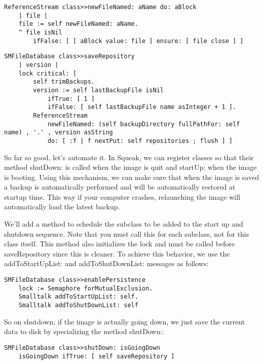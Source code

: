 \documentclass[a4paper,10pt,twoside]{book}
\newcommand{\ct}[1]{{\small\ttfamily\textup{#1}}}
\begin{document}
\begin{lstlisting}
ReferenceStream class>>newFileNamed: aName do: aBlock
    | file |
    file := self newFileNamed: aName.
    ^ file isNil
        ifFalse: [ [ aBlock value: file ] ensure: [ file close ] ]
\end{lstlisting}

\begin{lstlisting}
SMFileDatabase class>>saveRepository
    | version |
    lock critical: [ 
        self trimBackups.
        version := self lastBackupFile isNil
            ifTrue: [ 1 ]
            ifFalse: [ self lastBackupFile name asInteger + 1 ].
        ReferenceStream
            newFileNamed: (self backupDirectory fullPathFor: self name) , '.' , version asString
            do: [ :f | f nextPut: self repositories ; flush ] ]
\end{lstlisting}

So far so good, let's automate it. In Squeak, we can register classes so that their method \ct{shutDown:} is called when the image is quit and \ct{startUp:} when the image is booting. Using this mechanism, we can make sure that when the image is saved a backup is automatically performed and will be automatically restored at startup time. This way if your computer crashes, relaunching the image will automatically load the latest backup.

We'll add a method to schedule the subclass to be added to the start up and shutdown sequence. Note that you must call this for each subclass, not for this class itself. This method also initializes the lock and must be called before \ct{saveRepository} since this is cleaner. To achieve this behavior, we use the \ct{addToStartUpList:} and \ct{addToShutDownList:} messages as follows:

\begin{lstlisting}
SMFileDatabase class>>enablePersistence
    lock := Semaphore forMutualExclusion.
    Smalltalk addToStartUpList: self.
    Smalltalk addToShutDownList: self
\end{lstlisting}

So on shutdown, if the image is actually going down, we just save the current data to disk by specializing the method \ct{shutDown:}.

\begin{lstlisting}
SMFileDatabase class>>shutDown: isGoingDown
    isGoingDown ifTrue: [ self saveRepository ]
\end{lstlisting}
\end{document}
